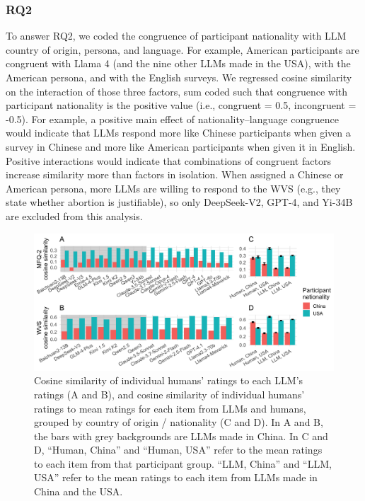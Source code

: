 \documentclass[11pt,a4paper]{article}
\begin{document}
\subsubsection{RQ2}
To answer RQ2, we coded the congruence of participant nationality with LLM country of origin, persona, and language. For example, American participants are congruent with Llama 4 (and the nine other LLMs made in the USA), with the American persona, and with the English surveys. We regressed cosine similarity on the interaction of those three factors, sum coded such that congruence with participant nationality is the positive value (i.e., congruent = 0.5, incongruent = -0.5). For example, a positive main effect of nationality--language congruence would indicate that LLMs respond more like Chinese participants when given a survey in Chinese and more like American participants when given it in English. Positive interactions would indicate that combinations of congruent factors increase similarity more than factors in isolation. When assigned a Chinese or American persona, more LLMs are willing to respond to the WVS (e.g., they state whether abortion is justifiable), so only DeepSeek-V2, GPT-4, and Yi-34B are excluded from this analysis.

\begin{figure}
    \centering
    \includegraphics[width=1\linewidth]{fig3.png}
    \caption{Cosine similarity of individual humans’ ratings to each LLM’s ratings (A and B), and cosine similarity of individual humans’ ratings to mean ratings for each item from LLMs and humans, grouped by country of origin / nationality (C and D). In A and B, the bars with grey backgrounds are LLMs made in China. In C and D, “Human, China” and “Human, USA” refer to the mean ratings to each item from that participant group. “LLM, China” and “LLM, USA” refer to the mean ratings to each item from LLMs made in China and the USA.}
    \label{fig:placeholder}
\end{figure}
\end{document}
